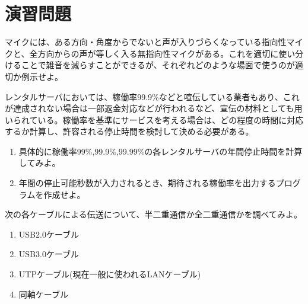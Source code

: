 \section*{演習問題}
\begin{problems}
\item マイクには、ある方向・角度からでないと声が入りづらくなっている指向性マイクと、全方向からの声が等しく入る無指向性マイクがある。これを適切に使い分けることで雑音を減らすことができるが、それぞれどのような場面で使うのが適切か例示せよ。

\item レンタルサーバにおいては、稼働率99.9\%などと喧伝している業者もあり、これが達成されない場合は一部返金対応などが行われるなど、宣伝の材料としても用いられている。稼働率を基準にサービスを考える場合は、どの程度の時間に対応するか計算し、許容される停止時間を検討して決める必要がある。
\begin{enumerate}
\item 具体的に稼働率99\%,99.9\%,99.99\%の各レンタルサーバの年間停止時間を計算してみよ。
\item 年間の停止可能秒数が入力されるとき、期待される稼働率を出力するプログラムを作成せよ。
\end{enumerate}

\item 次の各ケーブルによる伝送について、半二重通信か全二重通信かを調べてみよ。
\begin{enumerate}
\item USB2.0ケーブル
\item USB3.0ケーブル
\item UTPケーブル(現在一般に使われるLANケーブル)
\item 同軸ケーブル
\end{enumerate}

\end{problems}
